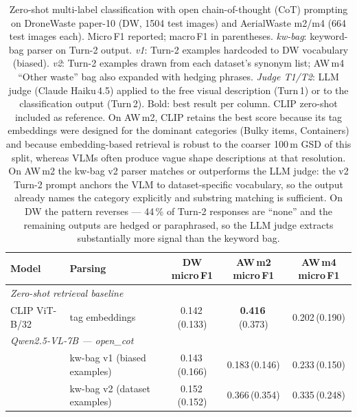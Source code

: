 \begin{table}[t]
\centering
\caption{%
  Zero-shot multi-label classification with open chain-of-thought (CoT)
  prompting on DroneWaste paper-10 (DW, 1504 test images) and
  AerialWaste m2/m4 (664 test images each).
  Micro\,F1 reported; macro\,F1 in parentheses.
  \textit{kw-bag}: keyword-bag parser on Turn-2 output.
  \textit{v1}: Turn-2 examples hardcoded to DW vocabulary (biased).
  \textit{v2}: Turn-2 examples drawn from each dataset's synonym list;
  AW\,m4 ``Other waste'' bag also expanded with hedging phrases.
  \textit{Judge T1/T2}: LLM judge (Claude Haiku\,4.5) applied to the
  free visual description (Turn\,1) or to the classification output
  (Turn\,2).  Bold: best result per column.
  CLIP zero-shot included as reference.
  On AW\,m2, CLIP retains the best score because its tag embeddings were
  designed for the dominant categories (Bulky items, Containers) and
  because embedding-based retrieval is robust to the coarser 100\,m GSD
  of this split, whereas VLMs often produce vague shape descriptions at
  that resolution.
  On AW\,m2 the kw-bag v2 parser matches or outperforms the LLM judge:
  the v2 Turn-2 prompt anchors the VLM to dataset-specific vocabulary,
  so the output already names the category explicitly and substring
  matching is sufficient.
  On DW the pattern reverses — 44\,\% of Turn-2 responses are ``none''
  and the remaining outputs are hedged or paraphrased, so the LLM judge
  extracts substantially more signal than the keyword bag.
}
\label{tab:vlm-cot}
\setlength{\tabcolsep}{5pt}
\begin{tabular}{llccc}
\toprule
Model & Parsing & DW micro\,F1 & AW\,m2 micro\,F1 & AW\,m4 micro\,F1 \\
\midrule
\multicolumn{5}{l}{\textit{Zero-shot retrieval baseline}} \\[2pt]
CLIP ViT-B/32          & tag embeddings & 0.142\,(0.133) & \textbf{0.416}\,(0.373) & 0.202\,(0.190) \\
\midrule
\multicolumn{5}{l}{\textit{Qwen2.5-VL-7B — open\_cot}} \\[2pt]
                       & kw-bag v1 (biased examples) & 0.143\,(0.166) & 0.183\,(0.146) & 0.233\,(0.150) \\
                       & kw-bag v2 (dataset examples) & 0.152\,(0.152) & 0.366\,(0.354) & 0.335\,(0.248) \\

\end{tabular}
\end{table}
